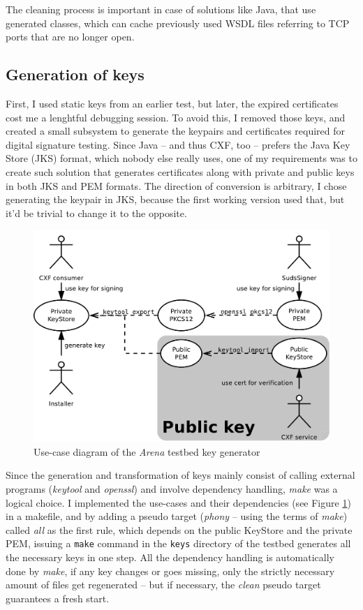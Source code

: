 The cleaning process is important in case of solutions like Java, that use generated classes, which can cache previously used WSDL files referring to TCP ports that are no longer open.

\subsection{Generation of keys}

First, I used static keys from an earlier test, but later, the expired certificates cost me a lenghtful debugging session. To avoid this, I removed those keys, and created a small subsystem to generate the keypairs and certificates required for digital signature testing. Since Java -- and thus CXF, too -- prefers the Java Key Store (JKS) format, which nobody else really uses, one of my requirements was to create such solution that generates certificates along with private and public keys in both JKS and PEM formats. The direction of conversion is arbitrary, I chose generating the keypair in JKS, because the first working version used that, but it'd be trivial to change it to the opposite.

\begin{figure}[htbp]
 \centering
 \includegraphics[width=14cm]{images/ucdArenaKeys.pdf}
 \caption{Use-case diagram of the \emph{Arena} testbed key generator}
 \label{fig:ucdArenaKeys}
\end{figure}

Since the generation and transformation of keys mainly consist of calling external programs (\emph{keytool} and \emph{openssl}) and involve dependency handling, \emph{make} was a logical choice. I implemented the use-cases and their dependencies (see Figure \ref{fig:ucdArenaKeys}) in a makefile, and by adding a pseudo target (\emph{phony} -- using the terms of \emph{make}) called \emph{all} as the first rule, which depends on the public KeyStore and the private PEM, issuing a \verb|make| command in the \verb|keys| directory of the testbed generates all the necessary keys in one step. All the dependency handling is automatically done by \emph{make}, if any key changes or goes missing, only the strictly necessary amount of files get regenerated -- but if necessary, the \emph{clean} pseudo target guarantees a fresh start.


